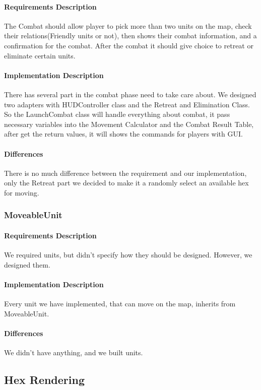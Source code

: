 \documentclass[12pt,a4paper,titlepage]{article}
\begin{document}
\paragraph{Requirements Description} The Combat should allow player 
to pick more than two units on the map, check their relations(Friendly 
units or not), then shows their combat information, and a confirmation 
for the combat. After the combat it should give choice to retreat or 
eliminate certain units.
\paragraph{Implementation Description} There has several part in 
the combat phase need to take care about. We designed two adapters with 
HUDController class and the Retreat and Elimination Class. So the 
LaunchCombat class will handle everything about combat, it pass 
necessary variables into the Movement Calculator and the Combat Result 
Table, after get the return values, it will shows the commands for 
players with GUI.
\paragraph{Differences} There is no much difference between the 
requirement and our implementation, only the Retreat part we decided to 
make it a randomly select an available hex for moving.

\subsubsection{MoveableUnit}
\paragraph{Requirements Description} We required units, but didn't specify how they should be designed. However, we designed them.
\paragraph{Implementation Description} Every unit we have implemented, that can move on the map, inherits from MoveableUnit. 
\paragraph{Differences} We didn't have anything, and we built units.

\subsection{Hex Rendering} 
\end{document}
